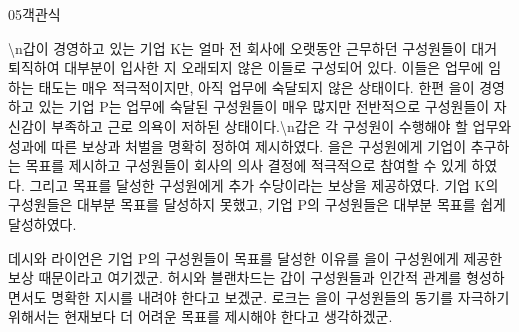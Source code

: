 \documentclass[fs85,seriesWit]{korfarm-base}
\begin{document}
\begin{kfQBlock}{05}{객관식}
\begin{kfEvidence}\textbackslash{}n갑이 경영하고 있는 기업 K는 얼마 전 회사에 오랫동안 근무하던 구성원들이 대거 퇴직하여 대부분이 입사한 지 오래되지 않은 이들로 구성되어 있다. 이들은 업무에 임하는 태도는 매우 적극적이지만, 아직 업무에 숙달되지 않은 상태이다. 한편 을이 경영하고 있는 기업 P는 업무에 숙달된 구성원들이 매우 많지만 전반적으로 구성원들이 자신감이 부족하고 근로 의욕이 저하된 상태이다.\textbackslash{}n갑은 각 구성원이 수행해야 할 업무와 성과에 따른 보상과 처벌을 명확히 정하여 제시하였다. 을은 구성원에게 기업이 추구하는 목표를 제시하고 구성원들이 회사의 의사 결정에 적극적으로 참여할 수 있게 하였다. 그리고 목표를 달성한 구성원에게 추가 수당이라는 보상을 제공하였다. 기업 K의 구성원들은 대부분 목표를 달성하지 못했고, 기업 P의 구성원들은 대부분 목표를 쉽게 달성하였다.\end{kfEvidence}
\begin{kfChoices}
\kfChoice 데시와 라이언은 기업 P의 구성원들이 목표를 달성한 이유를 을이 구성원에게 제공한 보상 때문이라고 여기겠군.
\kfChoice 허시와 블랜차드는 갑이 구성원들과 인간적 관계를 형성하면서도 명확한 지시를 내려야 한다고 보겠군.
\kfChoice 로크는 을이 구성원들의 동기를 자극하기 위해서는 현재보다 더 어려운 목표를 제시해야 한다고 생각하겠군.
\end{kfChoices}
\end{kfQBlock}
\end{document}
